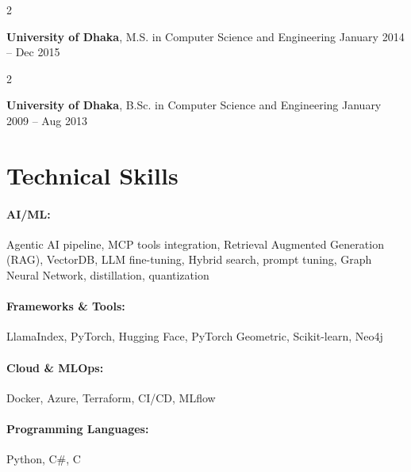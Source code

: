 \documentclass[10pt, letterpaper]{article}
\newenvironment{twocolentry}[2][]{
    \onecolentry
    \def\secondColumn{#2}
    \setcolumnwidth{\fill, 4.5 cm}
    \begin{paracol}{2}
}{
    \switchcolumn \raggedleft \secondColumn
    \end{paracol}
    \endonecolentry
} %
\begin{document}
        \begin{twocolentry}{
            January 2014 -- Dec 2015
        }
            \textbf{University of Dhaka}, M.S. in Computer Science and Engineering\end{twocolentry}

        \begin{twocolentry}{
            January 2009 -- Aug 2013
        }
            \textbf{University of Dhaka}, B.Sc. in Computer Science and Engineering\end{twocolentry}

\vspace{-1mm}
\section{Technical Skills}

        \paragraph{AI/ML:} Agentic AI pipeline, MCP tools integration, Retrieval Augmented Generation (RAG), VectorDB, LLM fine-tuning, Hybrid search, prompt tuning, Graph Neural Network, distillation, quantization
        \vspace{-4mm}
        \paragraph{Frameworks \& Tools:} LlamaIndex, PyTorch, Hugging Face, PyTorch Geometric, Scikit-learn, Neo4j
        \vspace{-4mm}
        \paragraph{Cloud \& MLOps:} Docker, Azure, Terraform, CI/CD, MLflow
        \vspace{-4mm}
        \paragraph{Programming Languages:} Python, C\#, C
\end{document}
